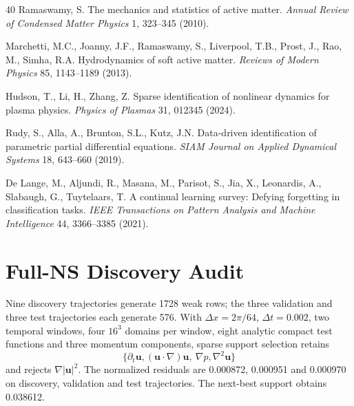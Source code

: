 \documentclass[preprint,12pt]{elsarticle}
\begin{document}
\begin{thebibliography}{40}
Ramaswamy, S.
The mechanics and statistics of active matter.
\textit{Annual Review of Condensed Matter Physics} 1, 323--345 (2010).

Marchetti, M.C., Joanny, J.F., Ramaswamy, S., Liverpool, T.B., Prost, J., Rao, M., Simha, R.A.
Hydrodynamics of soft active matter.
\textit{Reviews of Modern Physics} 85, 1143--1189 (2013).

Hudson, T., Li, H., Zhang, Z.
Sparse identification of nonlinear dynamics for plasma physics.
\textit{Physics of Plasmas} 31, 012345 (2024).

Rudy, S., Alla, A., Brunton, S.L., Kutz, J.N.
Data-driven identification of parametric partial differential equations.
\textit{SIAM Journal on Applied Dynamical Systems} 18, 643--660 (2019).

De Lange, M., Aljundi, R., Masana, M., Parisot, S., Jia, X., Leonardis, A., Slabaugh, G., Tuytelaars, T.
A continual learning survey: Defying forgetting in classification tasks.
\textit{IEEE Transactions on Pattern Analysis and Machine Intelligence} 44, 3366--3385 (2021).

\end{thebibliography}









































\clearpage
\appendix
\setcounter{table}{0}
\section{Full-NS Discovery Audit}
\label{sec:spider-hit}

Nine discovery trajectories generate 1728 weak rows; the three validation and
three test trajectories each generate 576. With $\Delta x=2\pi/64$,
$\Delta t=0.002$, two temporal windows, four $16^3$ domains per window, eight
analytic compact test functions and three momentum components, sparse support
selection retains
\[
\{\partial_t\mathbf u, (\mathbf u\cdot\nabla)\mathbf u,
\ \nabla p, \nabla^2\mathbf u\}
\]
and rejects $\nabla|\mathbf u|^2$. The normalized residuals are 0.000872,
0.000951 and 0.000970 on discovery, validation and test trajectories. The
next-best support obtains 0.038612.
\end{document}
